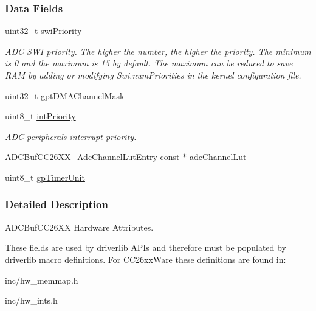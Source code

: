 \subsubsection*{Data Fields}
\begin{DoxyCompactItemize}
\item 
uint32\+\_\+t \hyperlink{struct_a_d_c_buf_c_c26_x_x___h_w_attrs_a28c09f6a57b37133bd331c59f0b7e9c3}{swi\+Priority}
\begin{DoxyCompactList}\small\item\em A\+D\+C S\+W\+I priority. The higher the number, the higher the priority. The minimum is 0 and the maximum is 15 by default. The maximum can be reduced to save R\+A\+M by adding or modifying Swi.\+num\+Priorities in the kernel configuration file. \end{DoxyCompactList}\item 
uint32\+\_\+t \hyperlink{struct_a_d_c_buf_c_c26_x_x___h_w_attrs_aa6cd006fc627af80afb01f4f65d9405f}{gpt\+D\+M\+A\+Channel\+Mask}
\item 
uint8\+\_\+t \hyperlink{struct_a_d_c_buf_c_c26_x_x___h_w_attrs_a8f26b88e0b885debb7659c20f719dce9}{int\+Priority}
\begin{DoxyCompactList}\small\item\em A\+D\+C peripheral\textquotesingle{}s interrupt priority. \end{DoxyCompactList}\item 
\hyperlink{struct_a_d_c_buf_c_c26_x_x___adc_channel_lut_entry}{A\+D\+C\+Buf\+C\+C26\+X\+X\+\_\+\+Adc\+Channel\+Lut\+Entry} const $\ast$ \hyperlink{struct_a_d_c_buf_c_c26_x_x___h_w_attrs_ad157d7e25bef35c76f3ae92bd912b109}{adc\+Channel\+Lut}
\item 
uint8\+\_\+t \hyperlink{struct_a_d_c_buf_c_c26_x_x___h_w_attrs_aa3672991bcc912125a7faca2befbb7d1}{gp\+Timer\+Unit}
\end{DoxyCompactItemize}


\subsubsection{Detailed Description}
A\+D\+C\+Buf\+C\+C26\+X\+X Hardware Attributes. 

These fields are used by driverlib A\+P\+Is and therefore must be populated by driverlib macro definitions. For C\+C26xx\+Ware these definitions are found in\+:
\begin{DoxyItemize}
\item inc/hw\+\_\+memmap.\+h
\item inc/hw\+\_\+ints.\+h
\end{DoxyItemize}

